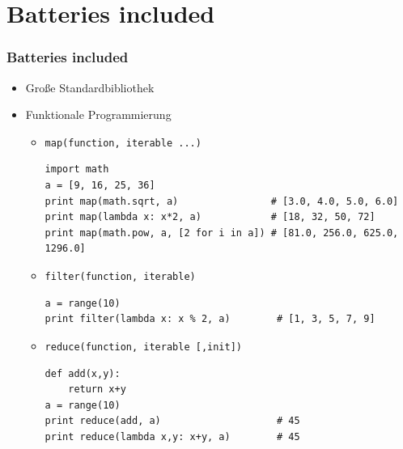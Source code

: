 \documentclass[10pt]{beamer}
\begin{document}
\section{Batteries included}
 \begin{frame}[fragile]
  \frametitle{Batteries included}
   \begin{itemize}
    \item Große Standardbibliothek
    \item Funktionale Programmierung
    \begin{itemize}


     \item \texttt{map(function, iterable ...)}
      \begin{lstlisting}
import math
a = [9, 16, 25, 36]
print map(math.sqrt, a)                # [3.0, 4.0, 5.0, 6.0]
print map(lambda x: x*2, a)            # [18, 32, 50, 72]
print map(math.pow, a, [2 for i in a]) # [81.0, 256.0, 625.0, 1296.0]
     \end{lstlisting}
    \item \texttt{filter(function, iterable)}
     \begin{lstlisting}
a = range(10)
print filter(lambda x: x % 2, a)        # [1, 3, 5, 7, 9]
     \end{lstlisting}
    \item \texttt{reduce(function, iterable [,init])}
     \begin{lstlisting}
def add(x,y):
    return x+y
a = range(10)
print reduce(add, a)                    # 45
print reduce(lambda x,y: x+y, a)        # 45
     \end{lstlisting}
    \end{itemize}
   \end{itemize}
\end{frame}

\end{document}
